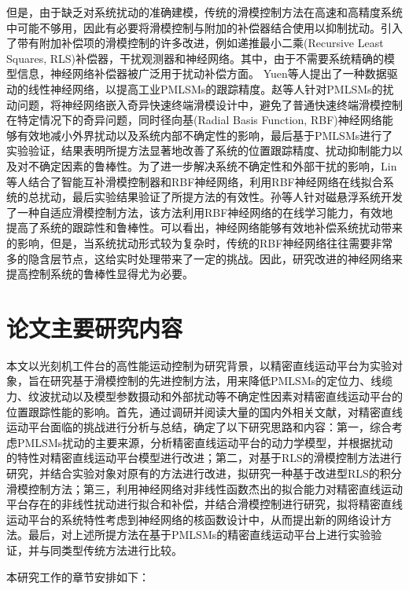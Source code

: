但是，由于缺乏对系统扰动的准确建模，传统的滑模控制方法在高速和高精度系统中可能不够用，因此有必要将滑模控制与附加的补偿器结合使用以抑制扰动。引入了带有附加补偿项的滑模控制的许多改进，例如递推最小二乘(Recursive Least Squares, RLS)补偿器\cite{butler2013magnetic}，干扰观测器\cite{zhang2016disturbance}和神经网络\cite{yuen2019data,zhao2019adaptive}。其中，由于不需要系统精确的模型信息，神经网络补偿器被广泛用于扰动补偿方面。 Yuen等人\cite{yuen2019data}提出了一种数据驱动的线性神经网络，以提高工业PMLSMs的跟踪精度。赵等人\cite{zhao2019adaptive}针对PMLSMs的扰动问题，将神经网络嵌入奇异快速终端滑模设计中，避免了普通快速终端滑模控制在特定情况下的奇异问题，同时径向基(Radial Basis Function, RBF)神经网络能够有效地减小外界扰动以及系统内部不确定性的影响，最后基于PMLSMs进行了实验验证，结果表明所提方法显著地改善了系统的位置跟踪精度、扰动抑制能力以及对不确定因素的鲁棒性。为了进一步解决系统不确定性和外部干扰的影响，Lin等人\cite{lin2010fpga}结合了智能互补滑模控制器和RBF神经网络，利用RBF神经网络在线拟合系统的总扰动，最后实验结果验证了所提方法的有效性。孙等人\cite{sun2019adaptive}针对磁悬浮系统开发了一种自适应滑模控制方法，该方法利用RBF神经网络的在线学习能力，有效地提高了系统的跟踪性和鲁棒性。可以看出，神经网络能够有效地补偿系统扰动带来的影响，但是，当系统扰动形式较为复杂时，传统的RBF神经网络往往需要非常多的隐含层节点，这给实时处理带来了一定的挑战。因此，研究改进的神经网络来提高控制系统的鲁棒性显得尤为必要。



\section{论文主要研究内容}
本文以光刻机工件台的高性能运动控制为研究背景，以精密直线运动平台为实验对象，旨在研究基于滑模控制的先进控制方法，用来降低PMLSMs的定位力、线缆力、纹波扰动以及模型参数摄动和外部扰动等不确定性因素对精密直线运动平台的位置跟踪性能的影响。首先，通过调研并阅读大量的国内外相关文献，对精密直线运动平台面临的挑战进行分析与总结，确定了以下研究思路和内容：第一，综合考虑PMLSMs扰动的主要来源，分析精密直线运动平台的动力学模型，并根据扰动的特性对精密直线运动平台模型进行改进；第二，对基于RLS的滑模控制方法进行研究，并结合实验对象对原有的方法进行改进，拟研究一种基于改进型RLS的积分滑模控制方法；第三，利用神经网络对非线性函数杰出的拟合能力对精密直线运动平台存在的非线性扰动进行拟合和补偿，并结合滑模控制进行研究，拟将精密直线运动平台的系统特性考虑到神经网络的核函数设计中，从而提出新的网络设计方法。最后，对上述所提方法在基于PMLSMs的精密直线运动平台上进行实验验证，并与同类型传统方法进行比较。

本研究工作的章节安排如下：


